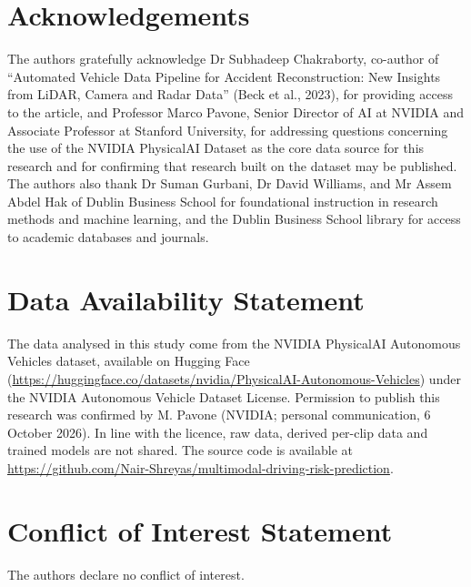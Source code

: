 \documentclass[11pt,a4paper]{article}
\begin{document}
\section*{Acknowledgements}
The authors gratefully acknowledge Dr Subhadeep Chakraborty, co-author of ``Automated Vehicle Data Pipeline for Accident Reconstruction: New Insights from LiDAR, Camera and Radar Data'' (Beck et al., 2023), for providing access to the article, and Professor Marco Pavone, Senior Director of AI at NVIDIA and Associate Professor at Stanford University, for addressing questions concerning the use of the NVIDIA PhysicalAI Dataset as the core data source for this research and for confirming that research built on the dataset may be published. The authors also thank Dr Suman Gurbani, Dr David Williams, and Mr Assem Abdel Hak of Dublin Business School for foundational instruction in research methods and machine learning, and the Dublin Business School library for access to academic databases and journals.

\section*{Data Availability Statement}
The data analysed in this study come from the NVIDIA PhysicalAI Autonomous Vehicles dataset, available on Hugging Face (\url{https://huggingface.co/datasets/nvidia/PhysicalAI-Autonomous-Vehicles}) under the NVIDIA Autonomous Vehicle Dataset License. Permission to publish this research was confirmed by M. Pavone (NVIDIA; personal communication, 6 October 2026). In line with the licence, raw data, derived per-clip data and trained models are not shared. The source code is available at \url{https://github.com/Nair-Shreyas/multimodal-driving-risk-prediction}.

\section*{Conflict of Interest Statement}
The authors declare no conflict of interest.
\end{document}
